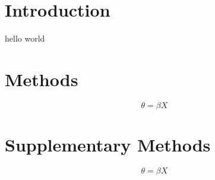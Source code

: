 \documentclass{ms}
\begin{document}
  \maketitle
  \section{Introduction}
  hello world
  \section{Methods}
  \begin{equation} \theta = \beta X \end{equation}
  \appendix
  \section{Supplementary Methods}
  \begin{equation} \theta = \beta X \end{equation}
\end{document}
